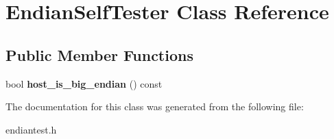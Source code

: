 \hypertarget{classEndianSelfTester}{
\section{EndianSelfTester Class Reference}
\label{classEndianSelfTester}
}
\subsection*{Public Member Functions}
\begin{DoxyCompactItemize}
\item 
\hypertarget{classEndianSelfTester_a1ac98cdbcbfaa82f42a9a283b0b81585}{
bool {\bfseries host\_\-is\_\-big\_\-endian} () const }
\label{classEndianSelfTester_a1ac98cdbcbfaa82f42a9a283b0b81585}

\end{DoxyCompactItemize}


The documentation for this class was generated from the following file:\begin{DoxyCompactItemize}
\item 
endiantest.h\end{DoxyCompactItemize}
